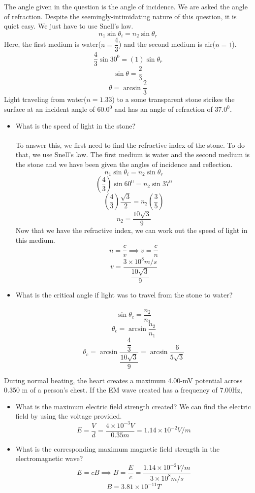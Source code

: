 \documentclass[12pt,addpoints]{exam}
\begin{document}
{{{\begin{questions}
\begin{center}
					\end{center}
					The angle given in the question is the angle of incidence. We are asked the angle of refraction. Despite the seemingly-intimidating nature of this question, it is quiet easy. We just have to use Snell's law.
					$$n_1\sin\theta_i=n_2\sin\theta_r$$
					Here, the first medium is water($n=\dfrac{4}{3}$) and the second medium is air($n=1$).
					$$\dfrac{4}{3}\sin30^0=(1)\sin\theta_r$$
					$$\sin\theta=\dfrac{2}{3}$$
					$$\theta=\arcsin\dfrac{2}{3}$$
					\question Light traveling from water($n=1.33$) to a some transparent stone strikes the surface at an incident angle of $60.0^0$ and has an angle of refraction of $37.0^0$.
					\begin{itemize}
						\item What is the speed of light in the stone? \\ \\
						To answer this, we first need to find the refractive index of the stone. To do that, we use Snell's law. The first medium is water and the second medium is the stone and we have been given the angles of incidence and reflection.
						$$n_1\sin\theta_i=n_2\sin\theta_r$$	
						$$(\dfrac{4}{3})\sin60^0=n_2\sin37^0$$
						$$(\dfrac{4}{3})\dfrac{\sqrt{3}}{2}=n_2(\dfrac{3}{5})$$
						$$n_2=\dfrac{10\sqrt{3}}{9}$$
						Now that we have the refractive index, we can work out the speed of light in this medium.
						$$n=\dfrac{c}{v}\implies v=\dfrac{c}{n}$$
						$$v=\dfrac{3\times10^{8}m/s}{\dfrac{10\sqrt{3}}{9}}$$
						\item What is the critical angle if light was to travel from the stone to water? \\ \\
						$$\sin\theta_c=\dfrac{n_2}{n_1}$$
						$$\theta_c=\arcsin\dfrac{n_2}{n_1}$$
						$$\theta_c=\arcsin\dfrac{\dfrac{4}{3}}{\dfrac{10\sqrt{3}}{9}}=\arcsin\dfrac{6}{5\sqrt{3}}$$
					\end{itemize}
					\question During normal beating, the heart creates a maximum 4.00-mV potential across 0.350 m of a person’s chest. If the EM wave created has a frequency of 7.00Hz,
					\begin{itemize}
						\item What is the maximum electric field strength created?
						We can find the electric field by using the voltage provided.
						$$E=\dfrac{V}{d}=\dfrac{4\times10^{-3}V}{0.35m}=1.14\times10^{-2}V/m$$
						\item What is the corresponding maximum magnetic field strength in the electromagnetic wave?
						$$E=cB\implies B=\dfrac{E}{c}=\dfrac{1.14\times10^{-2}V/m}{3\times10^{8}m/s}$$
						$$B=3.81\times10^{-11}T$$
					\end{itemize}

\end{questions}}}}
\end{document}
